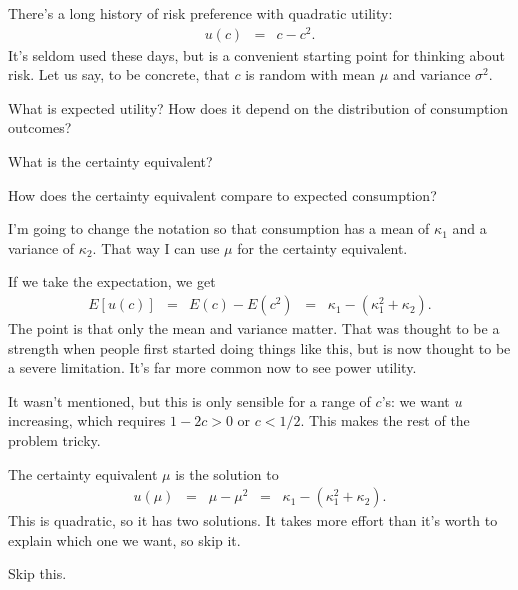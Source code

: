 \documentclass[11pt]{exam}
\begin{document}
\begin{questions}
There's a long history of risk preference with quadratic utility:
\begin{eqnarray*}
    u(c) &=& c - c^2 .
\end{eqnarray*}
It's seldom used these days, but is a convenient starting point
for thinking about risk.
Let us say, to be concrete, that
$c$ is random with mean $\mu$ and variance $\sigma^2$.
%
\begin{parts}
\item What is expected utility?
How does it depend on the distribution of consumption outcomes?
\item What is the certainty equivalent?
\item How does the certainty equivalent compare to expected consumption?
\end{parts}

\begin{solution}
I'm going to change the notation so that consumption has 
a mean of $\kappa_1$ and a variance of $\kappa_2$.
That way I can use $\mu$ for the certainty equivalent.  
\begin{parts}
\item If we take the expectation, we get
\begin{eqnarray*}
    E[u(c)] &=& E(c) - E(c^2) \;\;=\;\; \kappa_1 - ( \kappa_1^2 +  \kappa_2) .
\end{eqnarray*}
The point is that only the mean and variance matter.
That was thought to be a strength when people first started doing things like this, 
but is now thought to be a severe limitation.
It's far more common now to see power utility.  

It wasn't mentioned, but this is only sensible for a range of $c$'s:
we want $u$ increasing, which requires $1-2c > 0$ or $c < 1/2 $.
This makes the rest of the problem tricky.  

\item The certainty equivalent $\mu$ is the solution to 
\begin{eqnarray*}
    u(\mu) \;\;=\;\; \mu - \mu^2  \;\;=\;\; \kappa_1 - ( \kappa_1^2 +  \kappa_2)  .
\end{eqnarray*}
This is quadratic, so it has two solutions. 
It takes more effort than it's worth to explain which one we want, 
so skip it.   

\item Skip this.

\end{parts}
\end{solution}

\end{questions}


\end{document}
